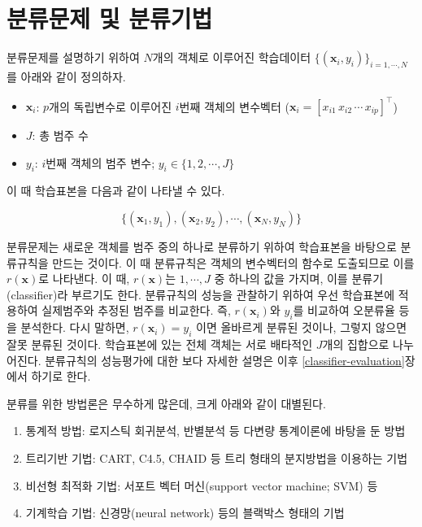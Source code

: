 \documentclass[
]{book}
\providecommand{\tightlist}{%
  \setlength{\itemsep}{0pt}\setlength{\parskip}{0pt}}
\begin{document}
\hypertarget{classification-problem-methods}{%
\section{분류문제 및 분류기법}\label{classification-problem-methods}}

분류문제를 설명하기 위하여 \(N\)개의 객체로 이루어진 학습데이터 \(\{(\mathbf{x}_i, y_i)\}_{i = 1, \cdots, N}\)를 아래와 같이 정의하자.

\begin{itemize}
\tightlist
\item
  \(\mathbf{x}_i\): \(p\)개의 독립변수로 이루어진 \(i\)번째 객체의 변수벡터 (\(\mathbf{x}_i = [x_{i1} \, x_{i2} \, \cdots \, x_{ip}]^\top\))
\item
  \(J\): 총 범주 수
\item
  \(y_i\): \(i\)번째 객체의 범주 변수; \(y_i \in \{1, 2, \cdots, J\}\)
\end{itemize}

이 때 학습표본을 다음과 같이 나타낼 수 있다.

\begin{equation*}
\{(\mathbf{x}_1, y_1), (\mathbf{x}_2, y_2), \cdots, (\mathbf{x}_N, y_N)\}
\end{equation*}

분류문제는 새로운 객체를 범주 중의 하나로 분류하기 위하여 학습표본을 바탕으로 분류규칙을 만드는 것이다. 이 때 분류규칙은 객체의 변수벡터의 함수로 도출되므로 이를 \(r(\mathbf{x})\)로 나타낸다. 이 때, \(r(\mathbf{x})\)는 \(1, \cdots, J\) 중 하나의 값을 가지며, 이를 분류기(classifier)라 부르기도 한다. 분류규칙의 성능을 관찰하기 위하여 우선 학습표본에 적용하여 실제범주와 추정된 범주를 비교한다. 즉, \(r(\mathbf{x}_i)\)와 \(y_i\)를 비교하여 오분류율 등을 분석한다. 다시 말하면, \(r(\mathbf{x}_i) = y_i\) 이면 올바르게 분류된 것이나, 그렇지 않으면 잘못 분류된 것이다. 학습표본에 있는 전체 객체는 서로 배타적인 \(J\)개의 집합으로 나누어진다. 분류규칙의 성능평가에 대한 보다 자세한 설명은 이후 \ref{classifier-evaluation}장에서 하기로 한다.

분류를 위한 방법론은 무수하게 많은데, 크게 아래와 같이 대별된다.

\begin{enumerate}
\def\labelenumi{\arabic{enumi}.}
\tightlist
\item
  통계적 방법: 로지스틱 회귀분석, 반별분석 등 다변량 통계이론에 바탕을 둔 방법
\item
  트리기반 기법: CART, C4.5, CHAID 등 트리 형태의 분지방법을 이용하는 기법
\item
  비선형 최적화 기법: 서포트 벡터 머신(support vector machine; SVM) 등
\item
  기계학습 기법: 신경망(neural network) 등의 블랙박스 형태의 기법
\end{enumerate}
\end{document}

